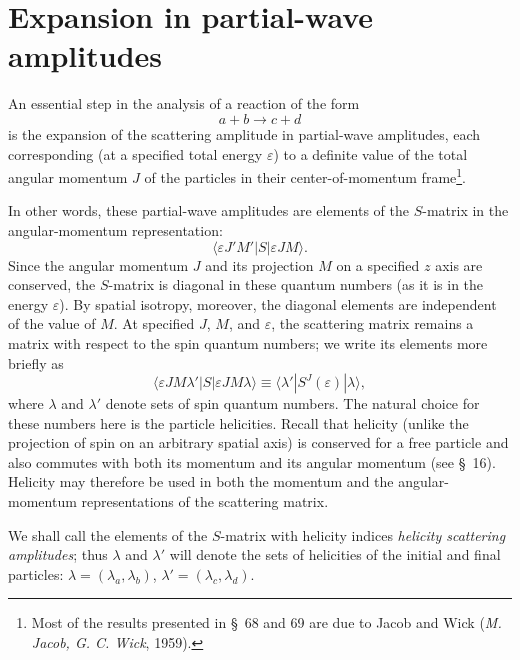\section{Expansion in partial-wave amplitudes}

An essential step in the analysis of a reaction of the form
\begin{equation}
a+b\to c+d
\tag{68.1}
\end{equation}
is the expansion of the scattering amplitude in partial-wave amplitudes, each corresponding (at a specified total energy $\varepsilon$) to a definite value of the total angular momentum $J$ of the particles in their center-of-momentum frame\footnote{Most of the results presented in \S~68 and 69 are due to Jacob and Wick (\emph{M. Jacob, G. C. Wick}, 1959).}.

In other words, these partial-wave amplitudes are elements of the $S$-matrix in the angular-momentum representation:
\[
\langle\varepsilon J'M'|S|\varepsilon JM\rangle.
\]
Since the angular momentum $J$ and its projection $M$ on a specified $z$ axis are conserved, the $S$-matrix is diagonal in these quantum numbers (as it is in the energy $\varepsilon$). By spatial isotropy, moreover, the diagonal elements are independent of the value of $M$. At specified $J$, $M$, and $\varepsilon$, the scattering matrix remains a matrix with respect to the spin quantum numbers; we write its elements more briefly as
\begin{equation}
\langle\varepsilon JM\lambda'|S|\varepsilon JM\lambda\rangle
\equiv\langle\lambda'|S^J(\varepsilon)|\lambda\rangle,
\tag{68.2}
\end{equation}
where $\lambda$ and $\lambda'$ denote sets of spin quantum numbers. The natural choice for these numbers here is the particle helicities. Recall that helicity (unlike the projection of spin on an arbitrary spatial axis) is conserved for a free particle and also commutes with both its momentum and its angular momentum (see \S~16). Helicity may therefore be used in both the momentum and the angular-momentum representations of the scattering matrix.

We shall call the elements of the $S$-matrix with helicity indices \emph{helicity scattering amplitudes}; thus $\lambda$ and $\lambda'$ will denote the sets of helicities of the initial and final particles: $\lambda=(\lambda_a,\lambda_b)$, $\lambda'=(\lambda_c,\lambda_d)$.

